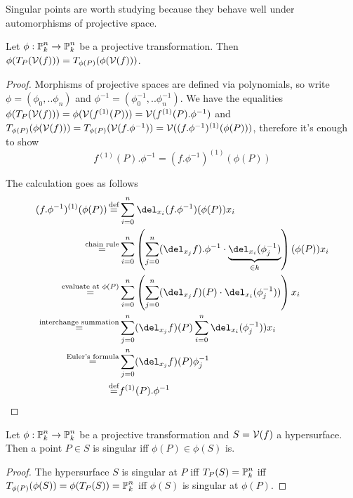 Singular points are worth studying because they behave well under automorphisms of projective space.

\begin{proposition} \label{propositionTangentTransform}
Let $\phi : \operatorname{\mathbb P}^n_k \to \operatorname{\mathbb P}^n_k$ be a projective transformation.
Then $\phi(T_P(\operatorname{\mathcal V}(f))) = T_{\phi(P)}(\phi(\operatorname{\mathcal V}(f)))$.
\end{proposition}
\begin{proof}
Morphisms of projective spaces are defined via polynomials, so write  $\phi = (\phi_0,..\phi_n)$ and $\phi^{-1} = (\phi^{-1}_0,..\phi^{-1}_n)$.
We have the equalities $\phi(T_P(\operatorname{\mathcal V}(f))) = \phi(\operatorname{\mathcal V}(f^{(1)}(P))) = \operatorname{\mathcal V}(f^{(1)}(P).\phi^{-1})$ and $T_{\phi(P)}(\phi(\operatorname{\mathcal V}(f))) = T_{\phi(P)}(\operatorname{\mathcal V}(f.\phi^{-1})) = \operatorname{\mathcal V}((f.\phi^{-1})^{(1)}(\phi(P)))$, therefore it's enough to show
\begin{equation}
f^{(1)}(P).\phi^{-1} = (f.\phi^{-1})^{(1)}(\phi(P))
\end{equation}

The calculation goes as follows
\begin{align}
(f.\phi^{-1})^{(1)}(\phi(P))
  \defeq& \sum_{i=0}^n \del_{x_i}(f.\phi^{-1})(\phi(P))x_i
\\\overset{\text{chain rule}}=& \sum_{i=0}^n \left(\sum_{j=0}^n (\del_{x_j}f).\phi^{-1} \cdot \underset{\in k}{\underbrace{\del_{x_i}(\phi_j^{-1})}}\right)(\phi(P))x_i
\\\overset{\text{evaluate at }\phi(P)}=& \sum_{i=0}^n \left(\sum_{j=0}^n (\del_{x_j}f)(P) \cdot \del_{x_i}(\phi_j^{-1}))\right)x_i
\\\overset{\text{interchange summation}}=& \sum_{j=0}^n (\del_{x_j}f)(P) \sum_{i=0}^n \del_{x_i}(\phi_j^{-1}))x_i
\\\overset{\text{Euler's formula}}=& \sum_{j=0}^n (\del_{x_j}f)(P) \phi_j^{-1}
\\\defeq& f^{(1)}(P).\phi^{-1}
\end{align}
\end{proof}

\begin{corollary}
Let $\phi : \operatorname{\mathbb P}^n_k \to \operatorname{\mathbb P}^n_k$ be a projective transformation and $S = \operatorname{\mathcal V}(f)$ a hypersurface.
Then a point $P \in S$ is singular iff $\phi(P) \in \phi(S)$ is.
\end{corollary}
\begin{proof}
The hypersurface $S$ is singular at $P$ iff $T_P(S) = \operatorname{\mathbb P}^n_k$ iff $T_{\phi(P)}(\phi(S)) = \phi(T_P(S)) = \operatorname{\mathbb P}^n_k$ iff $\phi(S)$ is singular at $\phi(P)$.
\end{proof}

